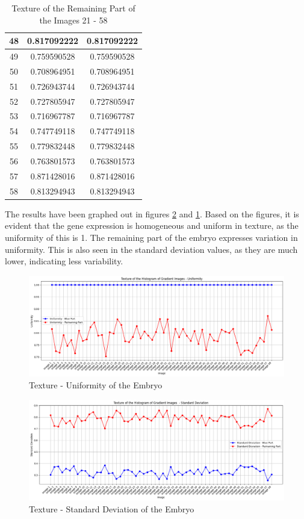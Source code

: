 \documentclass{article}
\begin{document}
\begin{table}[h!]
\begin{tabular}{|c|c|c|}
        48 & 0.817092222 & 0.817092222 \\ \hline
        49 & 0.759590528 & 0.759590528 \\ \hline
        50 & 0.708964951 & 0.708964951 \\ \hline
        51 & 0.726943744 & 0.726943744 \\ \hline
        52 & 0.727805947 & 0.727805947 \\ \hline
        53 & 0.716967787 & 0.716967787 \\ \hline
        54 & 0.747749118 & 0.747749118 \\ \hline
        55 & 0.779832448 & 0.779832448 \\ \hline
        56 & 0.763801573 & 0.763801573 \\ \hline
        57 & 0.871428016 & 0.871428016 \\ \hline
        58 & 0.813294943 & 0.813294943 \\ \hline
    \end{tabular}
    \caption{Texture of the Remaining Part of the Images 21 - 58}
    \label{tab:texture_yellow_2158}
\end{table}
\clearpage
The results have been graphed out in figures \ref{fig:standard-hog} and \ref{fig:uniformity-hog}. Based on the figures, it is evident that the gene expression is homogeneous and uniform in texture, as the uniformity of this is 1. The remaining part of the embryo expresses variation in uniformity. This is also seen in the standard deviation values, as they are much lower, indicating less variability. 
\begin{figure}[h!]
    \centering
    \includegraphics[width=0.75\linewidth]{Report/Images/HoG_Uniformity Graph.png}
    \caption{Texture - Uniformity of the Embryo}
    \label{fig:uniformity-hog}
\end{figure}

\begin{figure}[h!]
    \centering
    \includegraphics[width=0.75\linewidth]{Report/Images/HoG_StandardDeviation Graph.png}
    \caption{Texture - Standard Deviation of the Embryo}
    \label{fig:standard-hog}
\end{figure}
\end{document}
